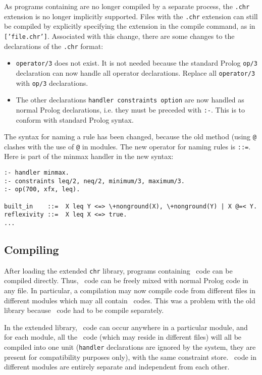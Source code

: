 As programs containing {\chrs} are no longer compiled by a separate process, 
the {\tt .chr} extension is no longer implicitly supported. Files with
the {\tt .chr} extension can still be compiled by explicitly specifying 
the extension in the compile command, as in {\tt ['file.chr']}. Associated
with this change, there are some changes to the declarations of the {\tt .chr}
format:

\begin{itemize}
\item {\tt operator/3} does not exist. It is not needed because the
standard Prolog {\tt op/3} declaration can now handle all operator 
declarations. Replace all {\tt operator/3} with {\tt op/3} declarations.
\item The other declarations {\tt handler constraints option} are now handled
as normal Prolog declarations, i.e. they must be preceded with 
{\tt :-}. This is to conform with standard Prolog syntax.
\end{itemize}

The syntax for naming a rule has been changed, because the old method (using
{\tt @} clashes with the use of {\tt @} in modules. The new operator
for naming rules is {\tt ::=}. Here is part of the minmax handler in the
new syntax:

\begin{verbatim}
:- handler minmax.
:- constraints leq/2, neq/2, minimum/3, maximum/3.
:- op(700, xfx, leq).

built_in    ::=  X leq Y <=> \+nonground(X), \+nonground(Y) | X @=< Y.
reflexivity ::=  X leq X <=> true.
...
\end{verbatim}
 
\subsection{Compiling}

After loading the extended {\tt chr} library, programs containing \chr\  code can
be compiled directly. Thus, \chr\  code can be freely mixed with normal Prolog
code in any file. In particular, a compilation may now compile code from 
different files in different modules which may all contain \chr\  codes. This
was a problem with the old library because \chr\  code had to be compile
separately. 

In the extended library, \chr\  code can occur anywhere in a particular module, and
for each module, all the \chr\  code (which may reside in different files)
will all be compiled into one unit ({\tt handler} declarations are ignored
by the system, they are present for compatibility purposes only), with the
same constraint store. \chr\  code in different modules are entirely 
separate and independent from each other. 

